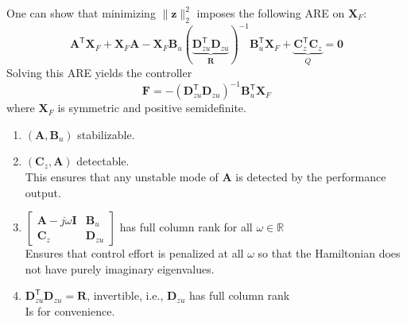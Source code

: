 \newpar{}

One can show that minimizing $\|\mathbf{z}\|_2^2$ imposes the following ARE on $\mathbf{X}_F$:
\begin{equation*}
    \mathbf{A}^{\mathsf{T}}\mathbf{X}_F + \mathbf{X}_F \mathbf{A} - \mathbf{X}_F \mathbf{B}_u{(\underbrace{\mathbf{D}_{zu}^{\mathsf{T}}\mathbf{D}_{zu}}_{\mathbf{R}})}^{-1} \mathbf{B}_u^{\mathsf{T}} \mathbf{X}_F + \underbrace{\mathbf{C}_z^{\mathsf{T}}\mathbf{C}_z}_{Q} = \mathbf{0}
\end{equation*}
Solving this ARE yields the controller
\begin{equation*}
    \mathbf{F} = -{\left(\mathbf{D}_{zu}^{\mathsf{T}}\mathbf{D}_{zu}\right)}^{-1} \mathbf{B}_u^{\mathsf{T}}\mathbf{X}_F
\end{equation*}
where $\mathbf{X}_F$ is symmetric and positive semidefinite.

\newpar{}

\begin{enumerate}
    \item $(\mathbf{A},\mathbf{B}_u)$ stabilizable.     %
    \item $(\mathbf{C}_z,\mathbf{A})$ detectable.\\
          This ensures that any unstable mode of $\mathbf{A}$ is detected by the performance output.
    \item $\begin{bmatrix} \mathbf{A}- j\omega \mathbf{I}& \mathbf{B}_u\\ \mathbf{C}_z& \mathbf{D}_{zu}\end{bmatrix}$ has full column rank for all $\omega\in\mathbb{R}$\\
          Ensures that control effort is penalized at all $\omega$ so that the Hamiltonian does not have purely imaginary eigenvalues.
    \item $\mathbf{D}_{zu}^{\mathsf{T}}\mathbf{D}_{zu}=\mathbf{R}$, invertible, i.e., $\mathbf{D}_{zu}$ has full column rank\\
          Is for convenience.
\end{enumerate}

\newpar{}

